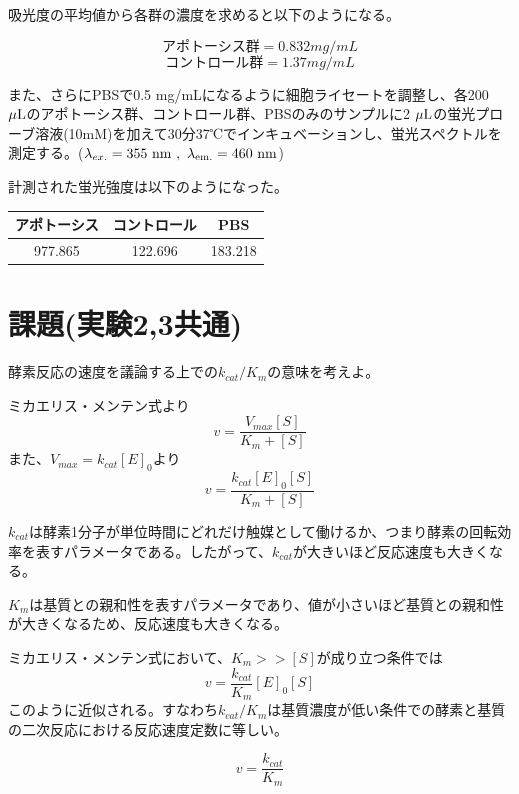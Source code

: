 \documentclass[a4paper,papersize,dvipdfmx]{jsarticle}
\begin{document}
吸光度の平均値から各群の濃度を求めると以下のようになる。

\[\mbox{アポトーシス群} =  0.832 mg/mL\]
\[\mbox{コントロール群} =   1.37 mg/mL\]


また、さらにPBSで0.5 mg/mLになるように細胞ライセートを調整し、各200 $\rm \mu L$のアポトーシス群、コントロール群、PBSのみのサンプルに2 $\rm \mu L$の蛍光プローブ溶液(10mM)を加えて30分37℃でインキュベーションし、蛍光スペクトルを測定する。($\lambda _{ex.}=355 \  \rm{nm} \ ,\ \lambda_{em.}=460 \  \rm{nm}$)

計測された蛍光強度は以下のようになった。

\begin{table}[H]
\begin{center}
\begin{tabular}{|c|c|c|}
\hline
アポトーシス  & コントロール  & PBS     \\ \hline
977.865 & 122.696 & 183.218 \\ \hline
\end{tabular}
\end{center}
\end{table}

\newpage

\section*{課題(実験2,3共通)}

\begin{tcolorbox}[colback=white,colbacktitle=black,coltitle=white,title={1. }]
酵素反応の速度を議論する上での$k_{cat}/K_m$の意味を考えよ。
\end{tcolorbox}
ミカエリス・メンテン式より
\[v = \frac{V_{max}[S]}{K_m+[S]}\]
また、$V_{max}=k_{cat}  [E]_0$より
\[v = \frac{k_{cat}[E]_0[S]}{K_m+[S]}\]


$k_{cat}$は酵素1分子が単位時間にどれだけ触媒として働けるか、つまり酵素の回転効率を表すパラメータである。したがって、$k_{cat}$が大きいほど反応速度も大きくなる。

$K_m$は基質との親和性を表すパラメータであり、値が小さいほど基質との親和性が大きくなるため、反応速度も大きくなる。

ミカエリス・メンテン式において、$K_m >> [S]$が成り立つ条件では
\[v = \frac{k_{cat}}{K_m}[E]_0[S]\]
このように近似される。すなわち$k_{cat}/K_m$は基質濃度が低い条件での酵素と基質の二次反応における反応速度定数に等しい。


\[v= \frac{k_{cat}}{K_m}\]

\
\end{document}
